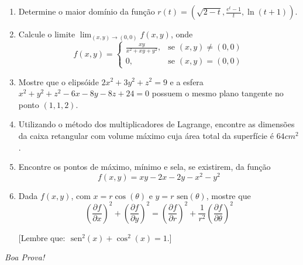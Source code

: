 \documentclass[a4paper,5pt]{amsbook}
\newcommand{\sen}{\text{\ sen}}
\newcommand{\ds}{\displaystyle}
\begin{document}
\vspace{0.2cm}
\begin{enumerate}

\item Determine o maior dom\'inio da fun\c{c}\~ao $r(t) = \left(\sqrt{2-t}, \ds\frac{e^t-1}{t}, \ln(t+1)\right)$.
\vspace{0.5cm}

\item Calcule o limite $\ds\lim_{(x,y)\rightarrow(0,0)} f(x,y)$, onde 
	$$f(x,y) = \left\{
		\begin{array}{cl}
			\ds\frac{xy}{x^2+xy+y^2}, & \mbox{se } (x,y) \neq (0,0) \\
			0, & \mbox{se } (x,y) = (0,0)
		\end{array}\right.$$
\vspace{0.5cm}

\item Mostre que o elips\'oide $2x^2+3y^2+z^2 = 9$ e a esfera
	$x^2+y^2+z^2-6x-8y-8z+24 = 0$ possuem o mesmo plano tangente no ponto
	$(1,1,2)$.
\vspace{0.5cm}

\item Utilizando o m\'etodo dos multiplicadores de Lagrange, encontre as
	dimens\~oes da caixa retangular com volume m\'aximo cuja \'area total da
	superf\'icie \'e $64cm^2$.
\vspace{0.5cm}

\item Encontre os pontos de m\'aximo, m\'inimo e sela, se existirem, da fun\c{c}\~ao
	$$f(x,y) = xy-2x-2y-x^2-y^2$$
\vspace{0.25cm}

\item Dada $f(x,y)$, com $x=r\cos(\theta)$ e $y=r\sen(\theta)$, mostre que
	$$\ds\left(\frac{\partial f}{\partial x}\right)^2 + \left(\frac{\partial f}{\partial y}\right)^2 = \left(\frac{\partial f}{\partial r}\right)^2 + \frac{1}{r^2}\left(\frac{\partial f}{\partial \theta}\right)^2$$

[Lembre que: $\sen^2(x) + \cos^2(x) = 1$.]

\end{enumerate}

\begin{flushright}
	\textit{Boa Prova!}
\end{flushright}
\end{document}

